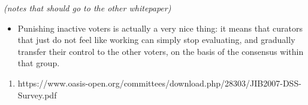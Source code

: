 \documentclass{article}
\begin{document}
{\em (notes that should go to the other whitepaper) }
\begin{itemize}
\item Punishing inactive voters is actually a very nice thing: it means that curators that just do not feel like working can simply stop evaluating, and gradually transfer their control to the other voters, on the basis of the consensus within that group.
\end{itemize}

\begin{enumerate}
\item https://www.oasis-open.org/committees/download.php/28303/JIB2007-DSS-Survey.pdf
\end{enumerate}
\end{document}

